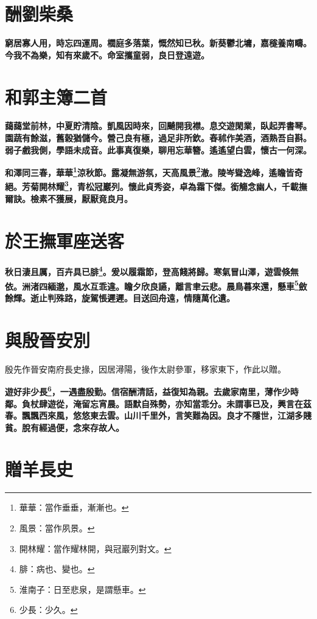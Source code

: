 \section{酬劉柴桑}

\textbf{窮居寡人用，時忘四運周。櫚庭多落葉，慨然知已秋。新葵鬱北墉，嘉穟養南疇。今我不為樂，知有來歲不。命室攜童弱，良日登遠遊。}

\section{和郭主簿二首}

\textbf{藹藹堂前林，中夏貯清陰。凱風因時來，回飇開我襟。息交遊閑業，臥起弄書琴。園蔬有餘滋，舊榖猶儲今。營己良有極，過足非所欽。舂秫作美酒，酒熟吾自斟。弱子戲我側，學語未成音。此事真復樂，聊用忘華簪。遙遙望白雲，懷古一何深。}

\textbf{和澤同三春，華華\footnote{華華：當作垂垂，漸漸也。}涼秋節。露凝無游氛，天高風景\footnote{風景：當作夙景。}澈。陵岑聳逸峰，遙瞻皆奇絕。芳菊開林耀\footnote{開林耀：當作耀林開，與冠巖列對文。}，青松冠巖列。懷此貞秀姿，卓為霜下傑。銜觴念幽人，千載撫爾訣。檢素不獲展，厭厭竟良月。}

\section{於王撫軍座送客}

\textbf{秋日淒且厲，百卉具已腓\footnote{腓：病也、變也。}。爰以履霜節，登高餞將歸。寒氣冒山澤，遊雲倏無依。洲渚四緬邈，風水互乖違。瞻夕欣良讌，離言聿云悲。晨鳥暮來還，懸車\footnote{淮南子：日至悲泉，是謂懸車。}斂餘輝。逝止判殊路，旋駕悵遲遲。目送回舟遠，情隨萬化遺。}

\section{與殷晉安別\hspace{1ex}{\footnotesize 并序}}

\begin{quoting}殷先作晉安南府長史掾，因居潯陽，後作太尉參軍，移家東下，作此以贈。\end{quoting}

\textbf{遊好非少長\footnote{少長：少久。}，一遇盡殷勤。信宿酬清話，益復知為親。去歲家南里，薄作少時鄰。負杖肆遊從，淹留忘宵晨。語默自殊勢，亦知當乖分。未謂事已及，興言在茲春。飄飄西來風，悠悠東去雲。山川千里外，言笑難為因。良才不隱世，江湖多賤貧。脫有經過便，念來存故人。}

\section{贈羊長史\hspace{1ex}{\footnotesize 并序}}

